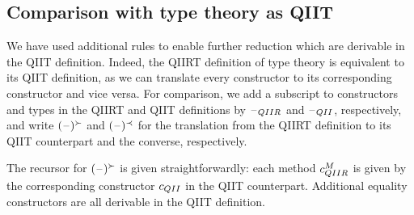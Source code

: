 \documentclass[a4paper,UKenglish,numberwithinsect,cleveref,thm-restate]{lipics-v2021}
\begin{document}
%

\subsection{Comparison with type theory as QIIT} \label{subsec:equivalence}
We have used additional rules to enable further reduction which are derivable in the QIIT definition.
Indeed, the QIIRT definition of type theory is equivalent to its QIIT definition, as we can translate every constructor to its corresponding constructor and vice versa.
For comparison, we add a subscript to constructors and types in the QIIRT and QIIT definitions by $\blank_\IR$ and $\blank_\I$, respectively, and write $(\mathord{\hspace{1pt}\text{--}\hspace{1pt}})^{\succ}$ and $(\mathord{\hspace{1pt}\text{--}\hspace{1pt}})^{\prec}$ for the translation from the QIIRT definition to its QIIT counterpart and the converse, respectively.

The recursor for $(\mathord{\hspace{1pt}\text{--}\hspace{1pt}})^{\succ}$ is given straightforwardly: each method $c^M_{\IR}$ is given by the corresponding constructor $c_{\I}$ in the QIIT counterpart.
Additional equality constructors are all derivable in the QIIT definition. 
\end{document}
